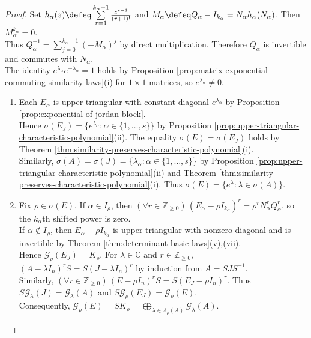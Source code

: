 \begin{theorem}
\begin{proof}
Set $h_{\alpha}(z)\defeq\sum\limits_{r=1}^{k_{\alpha}-1}\frac{z^{r-1}}{(r+1)!}$ and $M_{\alpha}\defeq Q_{\alpha}-I_{k_{\alpha}}=N_{\alpha}h_{\alpha}(N_{\alpha})$. Then $M_{\alpha}^{k_{\alpha}}=0$.\\
Thus $Q_{\alpha}^{-1}=\sum\limits_{j=0}^{k_{\alpha}-1}(-M_{\alpha})^j$ by direct multiplication. Therefore $Q_{\alpha}$ is invertible and commutes with $N_{\alpha}$.\\
The identity $e^{\lambda_{\alpha}}e^{-\lambda_{\alpha}}=1$ holds by Proposition \ref{prop:matrix-exponential-commuting-similarity-laws}(i) for $1\times1$ matrices, so $e^{\lambda_{\alpha}}\neq0$.
\begin{enumerate}[label=(\roman*)]
\setlength{\itemsep}{0pt}
\item Each $E_{\alpha}$ is upper triangular with constant diagonal $e^{\lambda_{\alpha}}$ by Proposition \ref{prop:exponential-of-jordan-block}.\\
Hence $\sigma(E_J)=\{e^{\lambda_{\alpha}}:\alpha\in\{1,\ldots,s\}\}$ by Proposition \ref{prop:upper-triangular-characteristic-polynomial}(ii). The equality $\sigma(E)=\sigma(E_J)$ holds by Theorem \ref{thm:similarity-preserves-characteristic-polynomial}(i).\\
Similarly, $\sigma(A)=\sigma(J)=\{\lambda_{\alpha}:\alpha\in\{1,\ldots,s\}\}$ by Proposition \ref{prop:upper-triangular-characteristic-polynomial}(ii) and Theorem \ref{thm:similarity-preserves-characteristic-polynomial}(i). Thus $\sigma(E)=\{e^{\lambda}:\lambda\in\sigma(A)\}$.
\item Fix $\rho\in\sigma(E)$. If $\alpha\in I_{\rho}$, then $(\forall r\in\mathbb{Z}_{\geq0})\,(E_{\alpha}-\rho I_{k_{\alpha}})^r=\rho^rN_{\alpha}^rQ_{\alpha}^r$, so the $k_{\alpha}$th shifted power is zero.\\
If $\alpha\notin I_{\rho}$, then $E_{\alpha}-\rho I_{k_{\alpha}}$ is upper triangular with nonzero diagonal and is invertible by Theorem \ref{thm:determinant-basic-laws}(v),(vii).\\
Hence $\mathcal{G}_{\rho}(E_J)=K_{\rho}$. For $\lambda\in\mathbb{C}$ and $r\in\mathbb{Z}_{\geq0}$, $(A-\lambda I_n)^rS=S(J-\lambda I_n)^r$ by induction from $A=SJS^{-1}$.\\
Similarly, $(\forall r\in\mathbb{Z}_{\geq0})\,(E-\rho I_n)^rS=S(E_J-\rho I_n)^r$. Thus $S\mathcal{G}_{\lambda}(J)=\mathcal{G}_{\lambda}(A)$ and $S\mathcal{G}_{\rho}(E_J)=\mathcal{G}_{\rho}(E)$.\\
Consequently, $\mathcal{G}_{\rho}(E)=SK_{\rho}=\bigoplus\limits_{\lambda\in\Lambda_{\rho}(A)}\mathcal{G}_{\lambda}(A)$.

\end{enumerate}
\end{proof}
\end{theorem}
